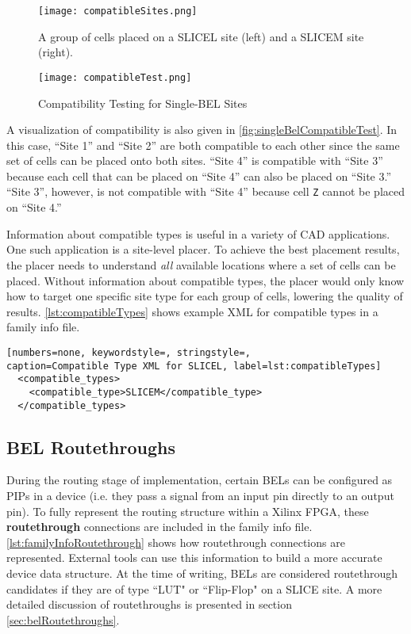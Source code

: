 \begin{figure}[h!]
  \centering
  \texttt{[image: compatibleSites.png]}
  \caption{A group of cells placed on a SLICEL site (left) and a SLICEM
  site (right).}
  \label{fig:sliceCompatibility}
\end{figure}

\begin{figure}[b!]
  \centering
  \texttt{[image: compatibleTest.png]}
  \caption{Compatibility Testing for Single-BEL Sites}
  \label{fig:singleBelCompatibleTest}
\end{figure}

A visualization of compatibility is also given in
\autoref{fig:singleBelCompatibleTest}. In this case, ``Site 1'' and ``Site 2''
are both compatible to each other since the same set of cells can be placed
onto both sites. ``Site 4'' is compatible with ``Site 3'' because each cell that
can be placed on ``Site 4'' can also be placed on ``Site 3.'' ``Site 3'', however, is
not compatible with ``Site 4'' because cell \texttt{Z} cannot be placed on
``Site 4.''

Information about compatible types is useful in a variety of CAD applications.
One such application is a site-level placer. To achieve the best
placement results, the placer needs to understand \emph{all} available
locations where a set of cells can be placed. Without information about
compatible types, the placer would only know how to target one specific site
type for each group of cells, lowering the quality of results.
\autoref{lst:compatibleTypes} shows example XML for compatible types in a
family info file.

\begin{lstlisting}[numbers=none, keywordstyle=, stringstyle=,
caption=Compatible Type XML for SLICEL, label=lst:compatibleTypes]
  <compatible_types>
    <compatible_type>SLICEM</compatible_type>
  </compatible_types>
\end{lstlisting}

\subsection{BEL Routethroughs}
During the routing stage of implementation, certain BELs can be configured as
PIPs in a device (i.e. they pass a signal from an input pin directly to an
output pin). To fully represent the routing structure within
a Xilinx FPGA, these \textbf{routethrough} connections are included in the
family info file. \autoref{lst:familyInfoRoutethrough} shows how routethrough
connections are represented. External tools can use this information to
build a more accurate device data structure. At the time of writing, BELs are
considered routethrough candidates if they are of type ``LUT" or ``Flip-Flop"
on a SLICE site. A more detailed discussion of routethroughs is presented in
section \ref{sec:belRoutethroughs}.

